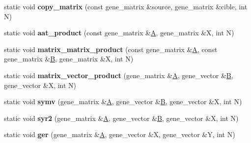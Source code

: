 \begin{DoxyCompactItemize}
static void {\bfseries copy\+\_\+matrix} (const gene\+\_\+matrix \&source, gene\+\_\+matrix \&cible, int N)
\item 
\mbox{\label{class_s_t_l__interface_a148dbc43db30109f1133a692909c1ed6}} 
static void {\bfseries aat\+\_\+product} (const gene\+\_\+matrix \&\hyperlink{group___core___module_class_eigen_1_1_matrix}{A}, gene\+\_\+matrix \&X, int N)
\item 
\mbox{\label{class_s_t_l__interface_a062057e758b4cc7e84a2e5d900f0527d}} 
static void {\bfseries matrix\+\_\+matrix\+\_\+product} (const gene\+\_\+matrix \&\hyperlink{group___core___module_class_eigen_1_1_matrix}{A}, const gene\+\_\+matrix \&\hyperlink{group___core___module_class_eigen_1_1_matrix}{B}, gene\+\_\+matrix \&X, int N)
\item 
\mbox{\label{class_s_t_l__interface_ad7400c19bfc252675ddb79f2e990b4a6}} 
static void {\bfseries matrix\+\_\+vector\+\_\+product} (gene\+\_\+matrix \&\hyperlink{group___core___module_class_eigen_1_1_matrix}{A}, gene\+\_\+vector \&\hyperlink{group___core___module_class_eigen_1_1_matrix}{B}, gene\+\_\+vector \&X, int N)
\item 
\mbox{\label{class_s_t_l__interface_a0abb3e5c9d352a4c0e913185b1cce4ab}} 
static void {\bfseries symv} (gene\+\_\+matrix \&\hyperlink{group___core___module_class_eigen_1_1_matrix}{A}, gene\+\_\+vector \&\hyperlink{group___core___module_class_eigen_1_1_matrix}{B}, gene\+\_\+vector \&X, int N)
\item 
\mbox{\label{class_s_t_l__interface_a01bcc8a5c5b1543abb284156dab0b64c}} 
static void {\bfseries syr2} (gene\+\_\+matrix \&\hyperlink{group___core___module_class_eigen_1_1_matrix}{A}, gene\+\_\+vector \&\hyperlink{group___core___module_class_eigen_1_1_matrix}{B}, gene\+\_\+vector \&X, int N)
\item 
\mbox{\label{class_s_t_l__interface_aa8f762ed88dace8bce9b69fc931df160}} 
static void {\bfseries ger} (gene\+\_\+matrix \&\hyperlink{group___core___module_class_eigen_1_1_matrix}{A}, gene\+\_\+vector \&X, gene\+\_\+vector \&Y, int N)
\item 
\mbox{\label{class_s_t_l__interface_a2c4ecb839106736405210ddd48b87f11}} 

\end{DoxyCompactItemize}
